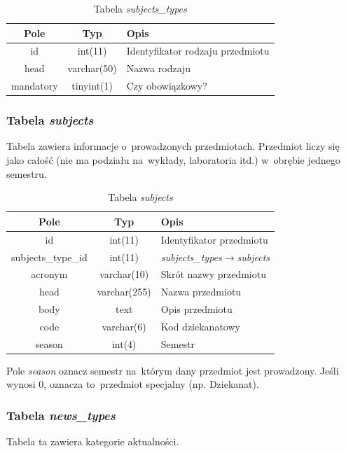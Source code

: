 \documentclass[a4paper,12pt,oneside]{report}
\begin{document}
\begin{table}[h]
  \centering
  \begin{tabular}{|c|c|l|}\hline
  Pole & Typ & Opis \\\hline
  id        & int(11)     & Identyfikator rodzaju przedmiotu \\
  head      & varchar(50) & Nazwa rodzaju \\
  mandatory & tinyint(1)  & Czy obowiązkowy? \\\hline
  \end{tabular}
  \caption{Tabela \emph{subjects\_types}\label{tab:subjects_types}}
\end{table}

\newpage
\subsubsection{Tabela \emph{subjects}}
\label{subsub:subjects}
Tabela zawiera informacje o~prowadzonych przedmiotach. Przedmiot liczy się jako całość (nie ma podziału na~wykłady, laboratoria itd.) w~obrębie jednego semestru.

\begin{table}[h]
  \centering
  \begin{tabular}{|c|c|l|}\hline
  Pole & Typ & Opis \\\hline
  id                 & int(11)      & Identyfikator przedmiotu\\
  subjects\_type\_id & int(11)      & \emph{subjects\_types}$\to$\emph{subjects}\\
  acronym            & varchar(10)  & Skrót nazwy przedmiotu\\
  head               & varchar(255) & Nazwa przedmiotu \\
  body               & text         & Opis przedmiotu \\
  code               & varchar(6)   & Kod dziekanatowy \\
  season             & int(4)       & Semestr \\\hline
  \end{tabular}
  \caption{Tabela \emph{subjects}\label{tab:subjects}}
\end{table}

Pole \emph{season} oznacz semestr na~którym dany przedmiot jest prowadzony. Jeśli wynosi 0, oznacza to~przedmiot specjalny (np. Dziekanat).

\subsubsection{Tabela \emph{news\_types}}
\label{subsub:news_types}
Tabela ta zawiera kategorie aktualności.
\end{document}

